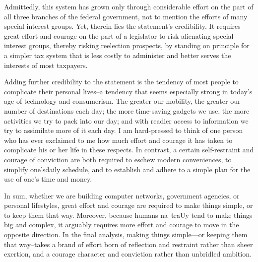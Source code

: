 Admittedly, this system has grown only through considerable effort on the part of all three branches of the federal government, not to mention the efforts of many special interest groups.
Yet, therein lies the statement's credibility.
It requires great effort and courage on the part of a legislator to risk alienating special interest groups, thereby risking reelection prospects, by standing on principle for a simpler tax system that is less costly to administer and better serves the interests of most taxpayers.


Adding further credibility to the statement is the tendency of most people to complicate their personal lives--a tendency that seems especially strong in today's age of technology and consumerism.
The greater our mobility, the greater our number of destinations each day; the more time-saving gadgets we use, the more activities we try to pack into our day; and with readier access to information we try to assimilate more of it each day.
I am hard-pressed to think of one person who has ever exclaimed to me how much effort and courage it has taken to complicate his or her life in these respects.
In contrast, a certain self-restraint and courage of conviction are both required to eschew modern conveniences, to simplify one'sdaily schedule, and to establish and adhere to a simple plan for the use of one's time and money.


In sum, whether we are building computer networks, government agencies, or personal lifestyles, great effort and courage are required to make things simple, or to keep them that way.
Moreover, because humans na~traUy tend to make things big and complex, it arguably requires more effort and courage to move in the opposite direction.
In the final analysis, making things simple---or keeping them that way--takes a brand of effort born of reflection and restraint rather than sheer exertion, and a courage character and conviction rather than unbridled ambition.
